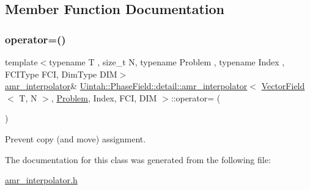 \subsection{Member Function Documentation}
\mbox{\label{classUintah_1_1PhaseField_1_1detail_1_1amr__interpolator_3_01VectorField_3_01T_00_01N_01_4_00_01ab3739ebd28e1ffb5bc0b138cfaddd80_aadd32c026392c0a152d1704b0ae69bd1}} 
\subsubsection{\texorpdfstring{operator=()}{operator=()}}
{\footnotesize\ttfamily template$<$typename T , size\+\_\+t N, typename Problem , typename Index , F\+C\+I\+Type F\+CI, Dim\+Type D\+IM$>$ \\
\hyperlink{classUintah_1_1PhaseField_1_1detail_1_1amr__interpolator}{amr\+\_\+interpolator}\& \hyperlink{classUintah_1_1PhaseField_1_1detail_1_1amr__interpolator}{Uintah\+::\+Phase\+Field\+::detail\+::amr\+\_\+interpolator}$<$ \hyperlink{structUintah_1_1PhaseField_1_1VectorField}{Vector\+Field}$<$ T, N $>$, \hyperlink{classUintah_1_1PhaseField_1_1Problem}{Problem}, Index, F\+CI, D\+IM $>$\+::operator= (\begin{DoxyParamCaption}\item[{const \hyperlink{classUintah_1_1PhaseField_1_1detail_1_1amr__interpolator}{amr\+\_\+interpolator}$<$ \hyperlink{structUintah_1_1PhaseField_1_1VectorField}{Vector\+Field}$<$ T, N $>$, \hyperlink{classUintah_1_1PhaseField_1_1Problem}{Problem}, Index, F\+CI, D\+IM $>$ \&}]{ }\end{DoxyParamCaption})\hspace{0.3cm}{\ttfamily [delete]}}



Prevent copy (and move) assignment. 



The documentation for this class was generated from the following file\+:\begin{DoxyCompactItemize}
\item 
\hyperlink{amr__interpolator_8h}{amr\+\_\+interpolator.\+h}\end{DoxyCompactItemize}
